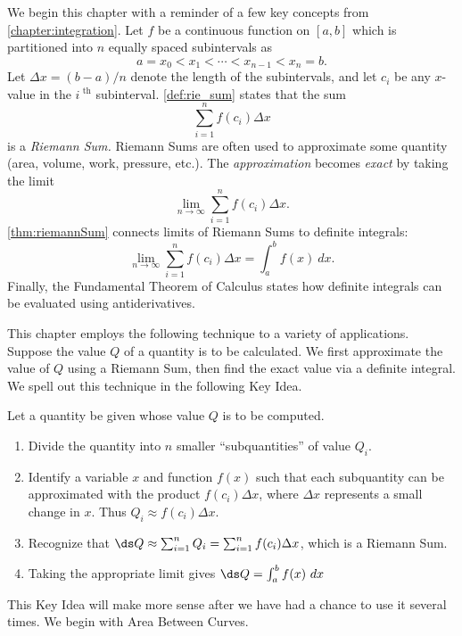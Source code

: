 







We begin this chapter with a reminder of a few key concepts from \autoref{chapter:integration}. Let $f$ be a continuous function on $[a,b]$ which is partitioned into $n$ equally spaced subintervals as 
\[a=x_0 < x_1 < \cdots < x_{n-1}<x_n=b.\]
Let $\Delta x=(b-a)/n$ denote the length of the  subintervals, and let $c_i$ be any $x$-value in the $i^\text{ th}$ subinterval. \autoref{def:rie_sum} states that the sum
\[\sum_{i=1}^n f(c_i)\Delta x\]
is a \textit{Riemann Sum.} Riemann Sums are often used to approximate some quantity (area, volume, work, pressure, etc.). The \textit{approximation} becomes \textit{exact} by taking the limit 
\[\lim_{n\to\infty} \sum_{i=1}^n f(c_i)\Delta x.\]
\autoref{thm:riemannSum} connects limits of Riemann Sums to definite integrals:
\[\lim_{n\to\infty} \sum_{i=1}^n f(c_i)\Delta x = \int_a^b f(x)\ dx.\]
Finally, the Fundamental Theorem of Calculus states how definite integrals can be evaluated using antiderivatives. 

This chapter employs the following technique to a variety of applications. Suppose the value $Q$ of a quantity is to be calculated. We first approximate the value of $Q$ using a Riemann Sum, then find the exact value via a definite integral. We spell out this technique in the following Key Idea.

{Let a quantity be given whose value $Q$ is to be computed.
\begin{enumerate}
\item	Divide the quantity into $n$ smaller ``subquantities'' of value $Q_i$.
\item	Identify a variable $x$ and function $f(x)$ such that each subquantity can be approximated with the product $f(c_i)\Delta x$, where $\Delta x$ represents a small change in $x$. Thus $Q_i \approx f(c_i)\Delta x$.
\item	Recognize that $\ds Q\approx \sum_{i=1}^n Q_i = \sum_{i=1}^n f(c_i)\Delta x$, which is a Riemann Sum.
\item	Taking the appropriate limit gives $\ds Q = \int_a^b f(x)\ dx$
\end{enumerate}}

This Key Idea will make more sense after we have had a chance to use it several times. We begin with Area Between Curves.%







\cleardoublepage
